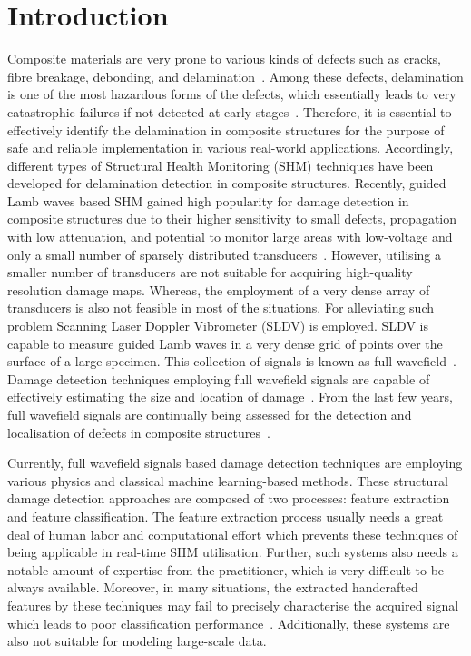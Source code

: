 \section{Introduction}
Composite materials are very prone to various kinds of defects such as cracks, fibre breakage, debonding, and delamination~\cite{ip2004delamination, smith2009composite}. Among these defects, delamination is one of the most hazardous forms of the defects, which essentially leads to very catastrophic failures if not detected at early stages~\cite{valdes1999delamination}. 
Therefore, it is essential to effectively identify the delamination in composite structures for the purpose of safe and reliable implementation in various real-world applications. 
Accordingly, different types of Structural Health Monitoring (SHM) techniques have been developed for delamination detection in composite structures. 
Recently, guided Lamb waves based SHM gained high popularity for damage detection in composite structures due to their higher sensitivity to small defects, propagation with low attenuation, and potential to monitor large areas with low-voltage and only a small number of sparsely distributed transducers~\cite{alleyne1992interaction, giurgiutiu2003lamb, ihn2008pitch, mitra2016guided}. 
However, utilising a smaller number of transducers are not suitable for acquiring high-quality resolution damage maps. Whereas, the employment of a very dense array of transducers is also not feasible in most of the situations. 
For alleviating such problem Scanning Laser Doppler Vibrometer (SLDV) is employed. SLDV is capable to measure guided Lamb waves in a very dense grid of points over the surface of a large specimen. 
This collection of signals is known as full wavefield~\cite{radzienski2019damage}. 
Damage detection techniques employing full wavefield signals are capable of effectively estimating the size and location of damage~\cite{girolamo2018impact, kudela2018impact}. From the last few years, full wavefield signals are continually being assessed for the detection and localisation of defects in composite structures~\cite{sohn2011delamination, sohn2011automated, rogge2013characterization, kudela2018impact, radzienski2019damage}.

Currently, full wavefield signals based damage detection techniques are employing various physics and classical machine learning-based methods. 
These structural damage detection approaches are composed of two processes: feature extraction and feature classification. 
The feature extraction process usually needs a great deal of human labor and computational effort which prevents these techniques of being applicable in real-time SHM utilisation. 
Further, such systems also needs a notable amount of expertise from the practitioner, which is very difficult to be always available. Moreover, in many situations, the extracted handcrafted features by these techniques may fail to precisely characterise the acquired signal which leads to poor classification performance~\cite{zhao2019deep, yuan2020machine}. Additionally, these systems are also not suitable for modeling large-scale data.

